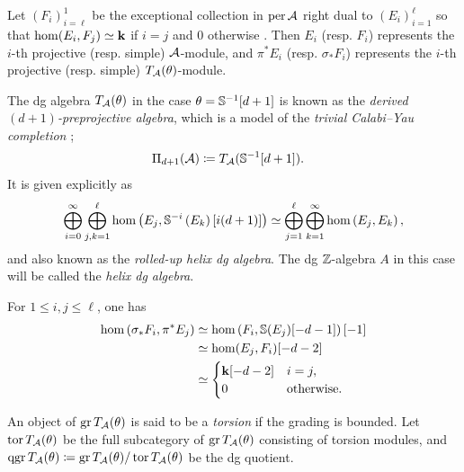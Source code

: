 \documentclass[a4paper,12pt]{amsart}
\begin{document}
Let $(F_i)_{i=\ell}^1$ be the exceptional collection in $\operatorname{per} \mathcal{A}$
right dual to $(E_i)_{i=1}^\ell$
so that $\hom(E_i,F_j) \simeq \mathbf{k}$ if $i=j$ and $0$ otherwise
\cite[Section 7]{MR992977}.
Then
$E_i$ (resp. $F_i$) represents
the $i$-th projective (resp. simple) $\mathcal{A}$-module,
and
$\pi^* E_i$ (resp. $\sigma_* F_i$) represents
the $i$-th projective (resp. simple) $T_{\mathcal{A}}(\theta)$-module.

The dg algebra $T_{\mathcal{A}}(\theta)$
in the case
$
\theta = \mathbb{S}^{-1}[d+1]
$
is known as
the \emph{derived $(d+1)$-preprojective algebra},
which is a model of the \emph{trivial Calabi--Yau completion}
\cite{MR2795754};
\begin{align}
  \Pi_{d+1}(\mathcal{A})
  &\coloneqq T_{\mathcal{A}}(\mathbb{S}^{-1}[d+1]).
\end{align}
It is given explicitly as
\begin{align}
 \bigoplus_{i=0}^\infty \bigoplus_{j,k=1}^\ell
  \hom\left( E_j, \mathbb{S}^{-i} \left( E_k \right) [i(d+1)] \right)
  \simeq \bigoplus_{j=1}^\ell \bigoplus_{k=1}^\infty
  \hom\left( E_j, E_k \right),
\end{align}
and also known as the \emph{rolled-up helix dg algebra}.
The dg $\mathbb{Z}$-algebra $A$ in this case will be called
the \emph{helix dg algebra}.

For $1 \le i, j \le \ell$,
one has
\begin{align}
 \hom \left( \sigma_* F_i, \pi^* E_j \right)
 &\simeq
 \hom
 \left(
 F_i
 ,
 \mathbb{S}(E_j)[-d-1]
 \right)[-1] \\
 &\simeq
 \hom(E_j,F_i)[-d-2] \\
 &\simeq
 \begin{cases}
  \mathbf{k}[-d-2] & i=j, \\
  0 & \text{otherwise}.
 \end{cases}
 \label{eq:dg_AS-Gorenstein}
\end{align}

An object of $\operatorname{gr} T_{\mathcal{A}}(\theta)$ is said to be
a \emph{torsion}
if the grading is bounded.
Let
$\operatorname{tor} T_{\mathcal{A}}(\theta)$
be the full subcategory
of $\operatorname{gr} T_{\mathcal{A}}(\theta)$
consisting of torsion modules,
and
$
\operatorname{qgr} T_{\mathcal{A}}(\theta)
\coloneqq \operatorname{gr} T_{\mathcal{A}}(\theta) / \operatorname{tor} T_{\mathcal{A}}(\theta)
$
be the dg quotient.
\end{document}
